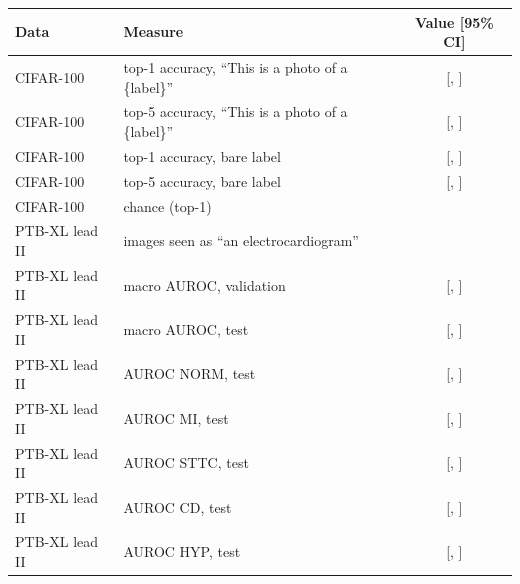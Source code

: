\begin{tabular}{llc}
\toprule
Data & Measure & Value [95\% CI] \\
\midrule
CIFAR-100 & top-1 accuracy, ``This is a photo of a \{label\}'' & \zeroshotCifarTopOneNotebook{} [\zeroshotCifarTopOneLoNotebook{}, \zeroshotCifarTopOneHiNotebook{}] \\
CIFAR-100 & top-5 accuracy, ``This is a photo of a \{label\}'' & \zeroshotCifarTopFiveNotebook{} [\zeroshotCifarTopFiveLoNotebook{}, \zeroshotCifarTopFiveHiNotebook{}] \\
CIFAR-100 & top-1 accuracy, bare label & \zeroshotCifarTopOneLabel{} [\zeroshotCifarTopOneLoLabel{}, \zeroshotCifarTopOneHiLabel{}] \\
CIFAR-100 & top-5 accuracy, bare label & \zeroshotCifarTopFiveLabel{} [\zeroshotCifarTopFiveLoLabel{}, \zeroshotCifarTopFiveHiLabel{}] \\
CIFAR-100 & chance (top-1) & \zeroshotCifarChanceTopOne{} \\
\midrule
PTB-XL lead II & images seen as ``an electrocardiogram'' & \zeroshotFracModalityEcgTest{} \\
PTB-XL lead II & macro AUROC, validation & \zeroshotValMacroAuroc{} [\zeroshotValMacroAurocLo{}, \zeroshotValMacroAurocHi{}] \\
PTB-XL lead II & macro AUROC, test & \zeroshotTestMacroAuroc{} [\zeroshotTestMacroAurocLo{}, \zeroshotTestMacroAurocHi{}] \\
PTB-XL lead II & AUROC NORM, test & \zeroshotTestAurocNORM{} [\zeroshotTestAurocNORMLo{}, \zeroshotTestAurocNORMHi{}] \\
PTB-XL lead II & AUROC MI, test & \zeroshotTestAurocMI{} [\zeroshotTestAurocMILo{}, \zeroshotTestAurocMIHi{}] \\
PTB-XL lead II & AUROC STTC, test & \zeroshotTestAurocSTTC{} [\zeroshotTestAurocSTTCLo{}, \zeroshotTestAurocSTTCHi{}] \\
PTB-XL lead II & AUROC CD, test & \zeroshotTestAurocCD{} [\zeroshotTestAurocCDLo{}, \zeroshotTestAurocCDHi{}] \\
PTB-XL lead II & AUROC HYP, test & \zeroshotTestAurocHYP{} [\zeroshotTestAurocHYPLo{}, \zeroshotTestAurocHYPHi{}] \\
\bottomrule
\end{tabular}
